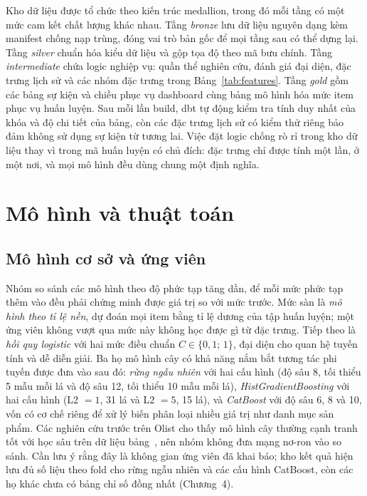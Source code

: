 \documentclass[12pt,a4paper]{report}
\begin{document}
Kho dữ liệu được tổ chức theo kiến trúc medallion, trong đó mỗi tầng có một mức cam kết chất lượng khác nhau. Tầng \emph{bronze} lưu dữ liệu nguyên dạng kèm manifest chống nạp trùng, đóng vai trò bản gốc để mọi tầng sau có thể dựng lại. Tầng \emph{silver} chuẩn hóa kiểu dữ liệu và gộp tọa độ theo mã bưu chính. Tầng \emph{intermediate} chứa logic nghiệp vụ: quần thể nghiên cứu, đánh giá đại diện, đặc trưng lịch sử và các nhóm đặc trưng trong Bảng~\ref{tab:features}. Tầng \emph{gold} gồm các bảng sự kiện và chiều phục vụ dashboard cùng bảng mô hình hóa mức item phục vụ huấn luyện. Sau mỗi lần build, dbt tự động kiểm tra tính duy nhất của khóa và độ chi tiết của bảng, còn các đặc trưng lịch sử có kiểm thử riêng bảo đảm không sử dụng sự kiện từ tương lai. Việc đặt logic chống rò rỉ trong kho dữ liệu thay vì trong mã huấn luyện có chủ đích: đặc trưng chỉ được tính một lần, ở một nơi, và mọi mô hình đều dùng chung một định nghĩa.

\section{Mô hình và thuật toán}\label{sec:models}

\subsection{Mô hình cơ sở và ứng viên}

Nhóm so sánh các mô hình theo độ phức tạp tăng dần, để mỗi mức phức tạp thêm vào đều phải chứng minh được giá trị so với mức trước. Mức sàn là \emph{mô hình theo tỉ lệ nền}, dự đoán mọi item bằng tỉ lệ dương của tập huấn luyện; một ứng viên không vượt qua mức này không học được gì từ đặc trưng. Tiếp theo là \emph{hồi quy logistic} với hai mức điều chuẩn $C \in \{0{,}1;\,1\}$, đại diện cho quan hệ tuyến tính và dễ diễn giải. Ba họ mô hình cây có khả năng nắm bắt tương tác phi tuyến được đưa vào sau đó: \emph{rừng ngẫu nhiên} với hai cấu hình (độ sâu 8, tối thiểu 5 mẫu mỗi lá và độ sâu 12, tối thiểu 10 mẫu mỗi lá), \emph{HistGradientBoosting} với hai cấu hình (L2 $=1$, 31 lá và L2 $=5$, 15 lá), và \emph{CatBoost} với độ sâu 6, 8 và 10, vốn có cơ chế riêng để xử lý biến phân loại nhiều giá trị như danh mục sản phẩm. Các nghiên cứu trước trên Olist cho thấy mô hình cây thường cạnh tranh tốt với học sâu trên dữ liệu bảng~\cite{zaghloul2024}, nên nhóm không đưa mạng nơ-ron vào so sánh. Cần lưu ý rằng đây là không gian ứng viên đã khai báo; kho kết quả hiện lưu đủ số liệu theo fold cho rừng ngẫu nhiên và các cấu hình CatBoost, còn các họ khác chưa có bảng chỉ số đồng nhất (Chương~4).
\end{document}
